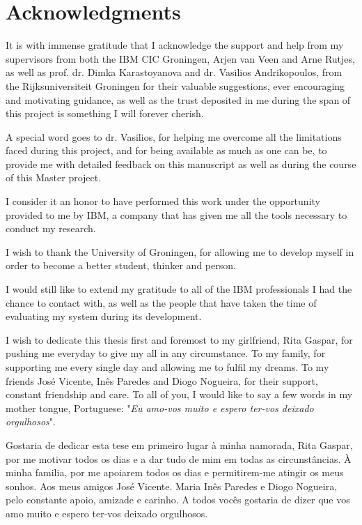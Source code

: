 \thispagestyle{acknowledgements}
\section*{Acknowledgments}
\label{sec:acknowledgments}

It is with immense gratitude that I acknowledge the support and help from my supervisors from both the IBM CIC Groningen, Arjen van Veen and Arne Rutjes, as well as prof. dr. Dimka Karastoyanova and dr. Vasilios Andrikopoulos, from the Rijksuniversiteit Groningen for their valuable suggestions, ever encouraging and motivating guidance, as well as the trust deposited in me during the span of this project is something I will forever cherish.

A special word goes to dr. Vasilios, for helping me overcome all the limitations faced during this project, and for being available as much as one can be, to provide me with detailed feedback on this manuscript as well as during the course of this Master project.

I consider it an honor to have performed this work under the opportunity provided to me by IBM, a company that has given me all the tools necessary to conduct my research.

I wish to thank the University of Groningen, for allowing me to develop myself in order to become a better student, thinker and person.

I would still like to extend my gratitude to all of the IBM professionals I had the chance to contact with, as well as the people that have taken the time of evaluating my system during its development.

I wish to dedicate this thesis first and foremost to my girlfriend, Rita Gaspar, for pushing me everyday to give my all in any circumstance. To my family, for supporting me every single day and allowing me to fulfil my dreams. To my friends José Vicente, Inês Paredes and Diogo Nogueira, for their support, constant friendship and care. To all of you, I would like to say a few words in my mother tongue, Portuguese: "\textit{Eu amo-vos muito e espero ter-vos deixado orgulhosos}".

Gostaria de dedicar esta tese em primeiro lugar à minha namorada, Rita Gaspar, por me motivar todos os dias e a dar tudo de mim em todas as circunstâncias. À minha familia, por me apoiarem todos os dias e permitirem-me atingir os meus sonhos. Aos meus amigos José Vicente. Maria Inês Paredes e Diogo Nogueira, pelo constante apoio, amizade e carinho. A todos vocês gostaria de dizer que vos amo muito e espero ter-vos deixado orgulhosos.